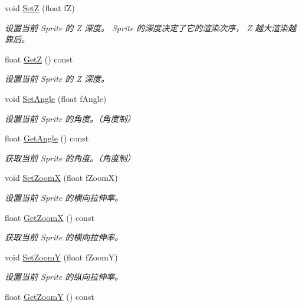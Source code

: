 \begin{DoxyCompactItemize}
void \hyperlink{class_iris2_d_1_1_iris_sprite_a284d2af8d27d8fb72718e9554e0e90d9}{SetZ} (float fZ)
\begin{DoxyCompactList}\small\item\em 设置当前 Sprite 的 Z 深度。 Sprite 的深度决定了它的渲染次序， Z 越大渲染越靠后。 \end{DoxyCompactList}\item 
float \hyperlink{class_iris2_d_1_1_iris_sprite_ad4966003c9bf2ad093db013de626e44c}{GetZ} () const
\begin{DoxyCompactList}\small\item\em 设置当前 Sprite 的 Z 深度。 \end{DoxyCompactList}\item 
void \hyperlink{class_iris2_d_1_1_iris_sprite_a3fdbc5131b10eb0cb544df0beee82da2}{Set\+Angle} (float f\+Angle)
\begin{DoxyCompactList}\small\item\em 设置当前 Sprite 的角度。（角度制） \end{DoxyCompactList}\item 
float \hyperlink{class_iris2_d_1_1_iris_sprite_aef46b946bf5f46465ea164debdc78e57}{Get\+Angle} () const
\begin{DoxyCompactList}\small\item\em 获取当前 Sprite 的角度。（角度制） \end{DoxyCompactList}\item 
void \hyperlink{class_iris2_d_1_1_iris_sprite_a0c7c13b0d3ec355a09e3c9c2ccc9d91e}{Set\+ZoomX} (float f\+ZoomX)
\begin{DoxyCompactList}\small\item\em 设置当前 Sprite 的横向拉伸率。 \end{DoxyCompactList}\item 
float \hyperlink{class_iris2_d_1_1_iris_sprite_a1cb9fb2549f00ef1efab204f0d222aeb}{Get\+ZoomX} () const
\begin{DoxyCompactList}\small\item\em 获取当前 Sprite 的横向拉伸率。 \end{DoxyCompactList}\item 
void \hyperlink{class_iris2_d_1_1_iris_sprite_a316b2fbf2d0ecb1a1cd5b7bb95d62f05}{Set\+ZoomY} (float f\+ZoomY)
\begin{DoxyCompactList}\small\item\em 设置当前 Sprite 的纵向拉伸率。 \end{DoxyCompactList}\item 
float \hyperlink{class_iris2_d_1_1_iris_sprite_a350aab21a9e40f7d26b8d757d26e4df2}{Get\+ZoomY} () const

\end{DoxyCompactItemize}
